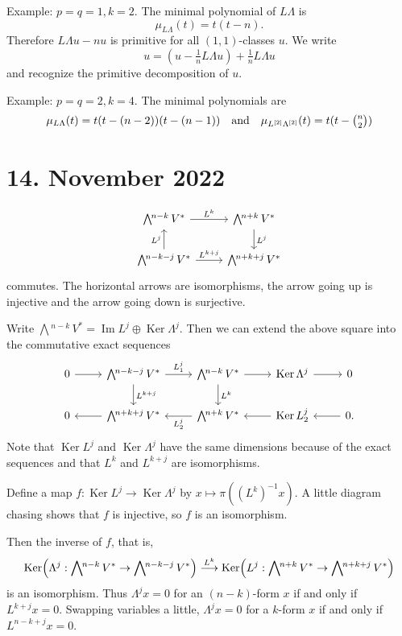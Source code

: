 \documentclass[11pt]{amsart}
\theoremstyle{definition}
\def\^#1{^{[#1]}}
\def\qandq{\quad\text{and}\quad}
\DeclareMathOperator{\im}{Im}
\DeclareMathOperator{\Ker}{Ker}
\newcommand{\ext}[1]{\bigwedge{}^{\!\!#1}\,}
\begin{document}
Example: $p = q = 1, k = 2$.
The minimal polynomial of $L\Lambda$ is
$$
\mu_{L\Lambda}(t) = t(t - n).
$$
Therefore $L\Lambda u - n u$ is primitive for all $(1,1)$-classes $u$.
We write
$$
u = (u - \tfrac 1n L\Lambda u) + \tfrac 1n L \Lambda u
$$
and recognize the primitive decomposition of $u$.

Example: $p = q = 2, k = 4$.
The minimal polynomials are
$$
\mu_{L\Lambda}(t) = t(t - (n-2))(t - (n-1))
\qandq
\mu_{L\^2\Lambda\^2}(t) = t(t - \tbinom{n}{2})
$$

\section{14. November 2022}

$$
\begin{tikzcd}
\ext{n-k} V^* \ar[r,"L^k"]  &
\ext{n+k} V^* \ar[d,"L^j"]
\\
\ext{n-k-j} V^* \ar[r,"L^{k+j}"] \ar[u,"L^j"] &
\ext{n+k+j} V^*
\end{tikzcd}
$$
commutes.
The horizontal arrows are isomorphisms, the arrow going up is injective and the
arrow going down is surjective.

Write $\ext{n-k} V^* = \im L^j \oplus \Ker \Lambda^j$.
Then we can extend the above square into the commutative exact sequences
$$
\begin{tikzcd}
0 \ar[r] &
\ext{n-k-j} V^* \ar[r,"L^j_1"] \ar[d,"L^{k+j}"] &
\ext{n-k} V^* \ar[r] \ar[d,"L^{k}"] &
\Ker \Lambda^j  \ar[r]  &
0
\\
0 &
\ext{n+k+j} V^* \ar[l] &
\ext{n+k} V^* \ar[l,"L^j_2"] &
\Ker L^j_2 \ar[l] &
0.\ar[l]
\end{tikzcd}
$$
Note that $\Ker L^j$ and $\Ker \Lambda^j$ have the same dimensions because of
the exact sequences and that $L^k$ and $L^{k+j}$ are isomorphisms.

Define a map $f : \Ker L^j \to \Ker \Lambda^j$ by $x \mapsto \pi((L^k)^{-1} x)$.
A little diagram chasing shows that $f$ is injective, so $f$ is an isomorphism.

Then the inverse of $f$, that is,
$$
\Ker \Bigl( \Lambda^j : \ext{n-k} V^* \to \ext{n-k-j} V^*\Bigr)
\stackrel{L^k}{\longrightarrow}
\Ker\Bigl( L^j : \ext{n+k}V^* \to \ext{n+k+j}V^*\Bigr)
$$
is an isomorphism.
Thus $\Lambda^j x = 0$ for an $(n-k)$-form $x$ if and only if
$L^{k+j} x = 0$.
Swapping variables a little, $\Lambda^j x = 0$ for a $k$-form $x$ if and only
if $L^{n-k+j} x = 0$.
\end{document}
